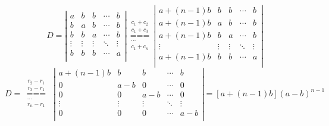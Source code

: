 $$
D=\left| \begin{matrix}
    a & b & b & \cdots  & b  \\
    b & a & b & \cdots  & b  \\
    b & b & a & \cdots  & b  \\
    \vdots  & \vdots  & \vdots  & \ddots & \vdots   \\
    b & b & b & \cdots  & a  \\
 \end{matrix} \right|
 \underset{\begin{smallmatrix} 
    \cdots  \\ 
    {{c}_{1}}+{{c}_{n}} 
   \end{smallmatrix}}{\overset{\begin{smallmatrix} 
    {{c}_{1}}+{{c}_{2}} \\ 
    {{c}_{1}}+{{c}_{3}} 
   \end{smallmatrix}}{\mathop{===}}}  
\left| \begin{matrix}
    a+(n-1)b & b & b    & \cdots  & b  \\
    a+(n-1)b & a & b    & \cdots  & b  \\
    a+(n-1)b & b & a    & \cdots  & b  \\
    \vdots   & \vdots   & \vdots  & \ddots & \vdots   \\
    a+(n-1)b & b & b    & \cdots  & a  \\
\end{matrix} \right| 
$$$$
D=\underset{\begin{smallmatrix} 
    \cdots  \\ 
    {{r}_{n}}-{{r}_{1}} 
   \end{smallmatrix}}{\overset{\begin{smallmatrix} 
    {{r}_{2}}-{{r}_{1}} \\ 
    {{r}_{3}}-{{r}_{1}} 
   \end{smallmatrix}}{\mathop{===}}}\,\ \left| \begin{matrix}
      a+(n-1)b & b & b & \cdots  & b  \\
      0 & a-b & 0 & \cdots  & 0  \\
      0 & 0 & a-b & \cdots  & 0  \\
      \vdots  & \vdots  & \vdots  & \ddots & \vdots   \\
      0 & 0 & 0 & \cdots  & a-b  \\
   \end{matrix} \right|
   =[a+(n-1)b]{{(a-b)}^{n-1}}
$$
